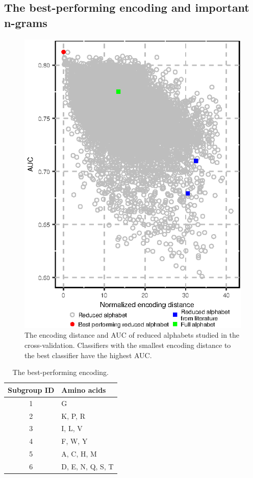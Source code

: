 \documentclass{bioinfo}
\begin{document}
\subsection{The best-performing encoding and important n-grams}

\begin{figure}[!tpb]
\centerline{\includegraphics{figures/ed_AUC.eps}}
\caption{The encoding distance and AUC of reduced alphabets studied in the 
cross-validation. 
Classifiers with the smallest encoding distance to the best classifier have 
the highest AUC.}\label{fig:ed_AUC}
\end{figure}

\begin{table}[ht]
\centering
\caption{The best-performing encoding.} 
\label{tab:best_enc}
\begin{tabular}{cl}
\toprule
Subgroup ID & Amino acids \\ 
\midrule
  1 & G \\ 
\rowcolor[gray]{0.85}  2 & K, P, R \\ 
3 & I, L, V \\ 
\rowcolor[gray]{0.85}  4 & F, W, Y \\ 
5 & A, C, H, M \\ 
\rowcolor[gray]{0.85}  6 & D, E, N, Q, S, T \\ 
\bottomrule
\end{tabular}
\end{table}
\end{document}
